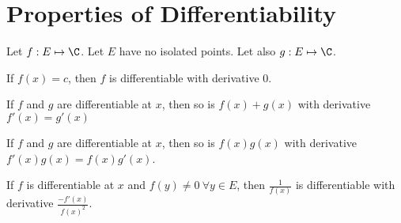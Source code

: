 \documentclass[../Main.tex]{subfiles}
\begin{document}
\section{Properties of Differentiability}
\begin{propositions}{
        Let $f : E \mapsto \C$. Let $E$ have no isolated points. Let also $g : E \mapsto \C$.
        \label{propsDiffProperties}
    }
    \item If $f(x) = c$, then $f$ is differentiable with derivative 0. \label{propConstantDiffability}    
    \item If $f$ and $g$ are differentiable at $x$, then so is $f(x) + g(x)$ with derivative $f'(x) = g'(x)$ \label{propSumDiffability}
    \item If $f$ and $g$ are differentiable at $x$, then so is $f(x)g(x)$ with derivative $f'(x) g(x) = f(x) g'(x)$. \label{propProdDiffability}
    \item If $f$ is differentiable at $x$ and $f(y) \neq 0~\forall y \in E$, then $\frac{1}{f(x)}$ is differentiable with derivative $\frac{-f'(x)}{f(x)^2}$. \label{propReciprocalDiffability}
\end{propositions}
\end{document}
